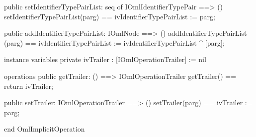 \begin{vdm_al}
  public setIdentifierTypePairList: seq of IOmlIdentifierTypePair ==> ()
  setIdentifierTypePairList(parg) == ivIdentifierTypePairList := parg;

  public addIdentifierTypePairList: IOmlNode ==> ()
  addIdentifierTypePairList (parg) == ivIdentifierTypePairList := ivIdentifierTypePairList ^ [parg];

instance variables
  private ivTrailer : [IOmlOperationTrailer] := nil

operations
  public getTrailer: () ==> IOmlOperationTrailer
  getTrailer() == return ivTrailer;

  public setTrailer: IOmlOperationTrailer ==> ()
  setTrailer(parg) == ivTrailer := parg;

end OmlImplicitOperation
\end{vdm_al}

